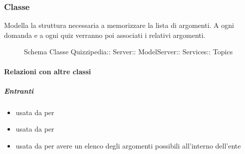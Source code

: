 \subsubsection{Classe }
Modella la struttura necessaria a memorizzare la lista di argomenti. A ogni domanda e a ogni quiz verranno poi associati i relativi argomenti.
\begin{figure}[H]
\centering
\noindent{}
\caption[Schema Classe Topics]{Schema Classe Quizzipedia:: Server:: ModelServer:: Services:: Topics}
\end{figure}
\paragraph{Relazioni con altre classi}
\subparagraph{Entranti}
\begin{itemize}
\item usata da  per 
\item usata da  per 
\item usata da  per avere un elenco degli argomenti possibili all'interno dell'ente
\end{itemize}
